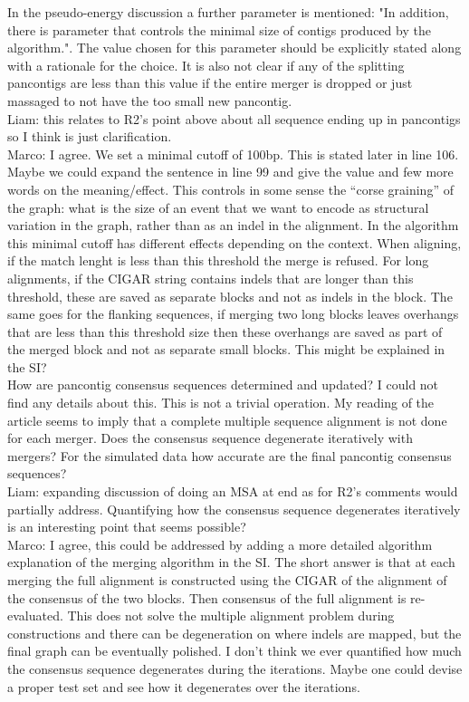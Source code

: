 \documentclass[aps,rmp,onecolumn]{revtex4-1}
\newcommand{\Marco}[1]{{\color{gray}Marco: #1}}
\newcommand{\Liam}[1]{{\color{teal}Liam: #1}}
\begin{document}
In the pseudo-energy discussion a further parameter is mentioned: "In addition, there is parameter that controls the minimal size of contigs produced by the algorithm.". The value chosen for this parameter should be explicitly stated along with a rationale for the choice. It is also not clear if any of the splitting pancontigs are less than this value if the entire merger is dropped or just massaged to not have the too small new pancontig.\\
\Liam{this relates to R2's point above about all sequence ending up in pancontigs so I think is just clarification.}\\
\Marco{I agree. We set a minimal cutoff of 100bp. This is stated later in line 106. Maybe we could expand the sentence in line 99 and give the value and few more words on the meaning/effect. This controls in some sense the ``corse graining'' of the graph: what is the size of an event that we want to encode as structural variation in the graph, rather than as an indel in the alignment. In the algorithm this minimal cutoff has different effects depending on the context. When aligning, if the match lenght is less than this threshold the merge is refused. For long alignments, if the CIGAR string contains indels that are longer than this threshold, these are saved as separate blocks and not as indels in the block. The same goes for the flanking sequences, if merging two long blocks leaves overhangs that are less than this threshold size then these overhangs are saved as part of the merged block and not as separate small blocks. This might be explained in the SI?}\\

How are pancontig consensus sequences determined and updated? I could not find any details about this. This is not a trivial operation. My reading of the article seems to imply that a complete multiple sequence alignment is not done for each merger. Does the consensus sequence degenerate iteratively with mergers? For the simulated data how accurate are the final pancontig consensus sequences?\\
\Liam{expanding discussion of doing an MSA at end as for R2's comments would partially address. Quantifying how the consensus sequence degenerates iteratively is an interesting point that seems possible?}\\
\Marco{I agree, this could be addressed by adding a more detailed algorithm explanation of the merging algorithm in the SI. The short answer is that at each merging the full alignment is constructed using the CIGAR of the alignment of the consensus of the two blocks. Then consensus of the full alignment is re-evaluated. This does not solve the multiple alignment problem during constructions and there can be degeneration on where indels are mapped, but the final graph can be eventually polished. I don't think we ever quantified how much the consensus sequence degenerates during the iterations. Maybe one could devise a proper test set and see how it degenerates over the iterations.}\\
\end{document}
